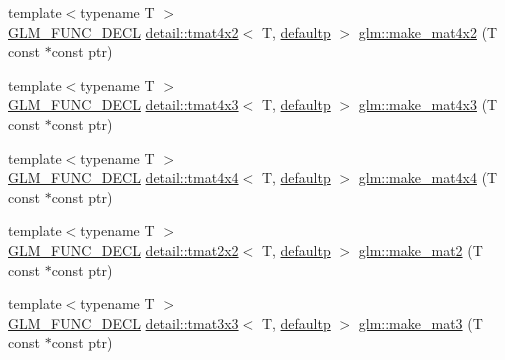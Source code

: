 \begin{DoxyCompactItemize}
\item 
{\footnotesize template$<$typename T $>$ }\\\hyperlink{setup_8hpp_ab2d052de21a70539923e9bcbf6e83a51}{G\+L\+M\+\_\+\+F\+U\+N\+C\+\_\+\+D\+E\+CL} \hyperlink{structglm_1_1detail_1_1tmat4x2}{detail\+::tmat4x2}$<$ T, \hyperlink{namespaceglm_a0f04f086094c747d227af4425893f545a9d21ccd8b5a009ec7eb7677befc3bf51}{defaultp} $>$ \hyperlink{group__gtc__type__ptr_gae4ad99adfe4fb195a192712a71de901d}{glm\+::make\+\_\+mat4x2} (T const $\ast$const ptr)
\item 
{\footnotesize template$<$typename T $>$ }\\\hyperlink{setup_8hpp_ab2d052de21a70539923e9bcbf6e83a51}{G\+L\+M\+\_\+\+F\+U\+N\+C\+\_\+\+D\+E\+CL} \hyperlink{structglm_1_1detail_1_1tmat4x3}{detail\+::tmat4x3}$<$ T, \hyperlink{namespaceglm_a0f04f086094c747d227af4425893f545a9d21ccd8b5a009ec7eb7677befc3bf51}{defaultp} $>$ \hyperlink{group__gtc__type__ptr_ga37ec66362c22d86ad2ee11930b638c4a}{glm\+::make\+\_\+mat4x3} (T const $\ast$const ptr)
\item 
{\footnotesize template$<$typename T $>$ }\\\hyperlink{setup_8hpp_ab2d052de21a70539923e9bcbf6e83a51}{G\+L\+M\+\_\+\+F\+U\+N\+C\+\_\+\+D\+E\+CL} \hyperlink{structglm_1_1detail_1_1tmat4x4}{detail\+::tmat4x4}$<$ T, \hyperlink{namespaceglm_a0f04f086094c747d227af4425893f545a9d21ccd8b5a009ec7eb7677befc3bf51}{defaultp} $>$ \hyperlink{group__gtc__type__ptr_ga4b13ff6840a66d032724a9a1db50f704}{glm\+::make\+\_\+mat4x4} (T const $\ast$const ptr)
\item 
{\footnotesize template$<$typename T $>$ }\\\hyperlink{setup_8hpp_ab2d052de21a70539923e9bcbf6e83a51}{G\+L\+M\+\_\+\+F\+U\+N\+C\+\_\+\+D\+E\+CL} \hyperlink{structglm_1_1detail_1_1tmat2x2}{detail\+::tmat2x2}$<$ T, \hyperlink{namespaceglm_a0f04f086094c747d227af4425893f545a9d21ccd8b5a009ec7eb7677befc3bf51}{defaultp} $>$ \hyperlink{group__gtc__type__ptr_ga903422b2c346cbaccad3153a5a1f404c}{glm\+::make\+\_\+mat2} (T const $\ast$const ptr)
\item 
{\footnotesize template$<$typename T $>$ }\\\hyperlink{setup_8hpp_ab2d052de21a70539923e9bcbf6e83a51}{G\+L\+M\+\_\+\+F\+U\+N\+C\+\_\+\+D\+E\+CL} \hyperlink{structglm_1_1detail_1_1tmat3x3}{detail\+::tmat3x3}$<$ T, \hyperlink{namespaceglm_a0f04f086094c747d227af4425893f545a9d21ccd8b5a009ec7eb7677befc3bf51}{defaultp} $>$ \hyperlink{group__gtc__type__ptr_gae50ecac46eb8771fb074e310b602bf53}{glm\+::make\+\_\+mat3} (T const $\ast$const ptr)

\end{DoxyCompactItemize}
